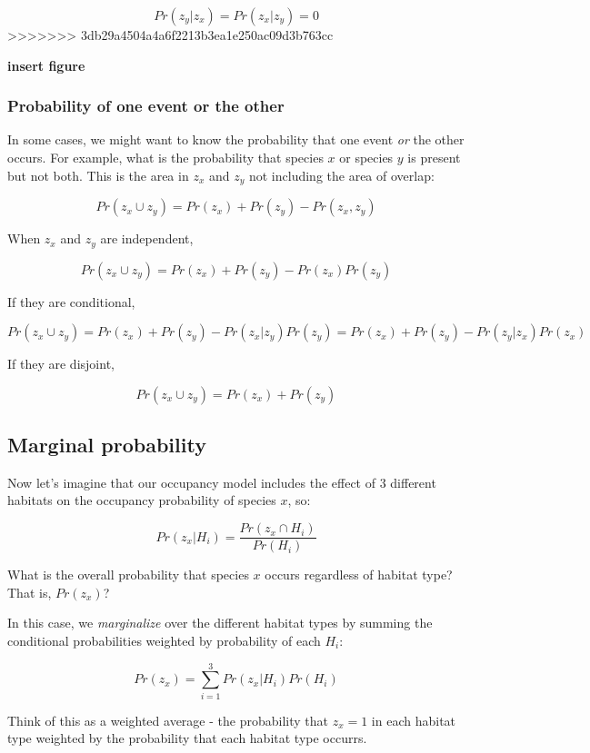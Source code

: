 \documentclass[]{article}
\begin{document}
\[Pr(z_y|z_x) = Pr(z_x|z_y) = 0\]
\textgreater{}\textgreater{}\textgreater{}\textgreater{}\textgreater{}\textgreater{}\textgreater{}
3db29a4504a4a6f2213b3ea1e250ac09d3b763cc

\textbf{insert figure}

\hypertarget{probability-of-one-event-or-the-other}{%
\subsubsection{Probability of one event or the
other}\label{probability-of-one-event-or-the-other}}

In some cases, we might want to know the probability that one event
\emph{or} the other occurs. For example, what is the probability that
species \(x\) or species \(y\) is present but not both. This is the area
in \(z_x\) and \(z_y\) not including the area of overlap:

\[Pr(z_x \cup z_y) = Pr(z_x) + Pr(z_y) - Pr(z_x,z_y)\]

When \(z_x\) and \(z_y\) are independent,

\[Pr(z_x \cup z_y) = Pr(z_x) + Pr(z_y) - Pr(z_x)Pr(z_y)\]

If they are conditional,

\[Pr(z_x \cup z_y) = Pr(z_x) + Pr(z_y) - Pr(z_x|z_y)Pr(z_y) = Pr(z_x) + Pr(z_y) - Pr(z_y|z_x)Pr(z_x)\]

If they are disjoint,

\[Pr(z_x \cup z_y) = Pr(z_x) + Pr(z_y)\]

\hypertarget{marginal-probability}{%
\subsection{Marginal probability}\label{marginal-probability}}

Now let's imagine that our occupancy model includes the effect of 3
different habitats on the occupancy probability of species \(x\), so:

\[Pr(z_x|H_i) = \frac{Pr(z_x \cap H_i)}{Pr(H_i)}\]

What is the overall probability that species \(x\) occurs regardless of
habitat type? That is, \(Pr(z_x)\)?

In this case, we \emph{marginalize} over the different habitat types by
summing the conditional probabilities weighted by probability of each
\(H_i\):

\[Pr(z_x) = \sum_{i=1}^3 Pr(z_x|H_i)Pr(H_i)\]

Think of this as a weighted average - the probability that \(z_x=1\) in
each habitat type weighted by the probability that each habitat type
occurrs.
\end{document}
